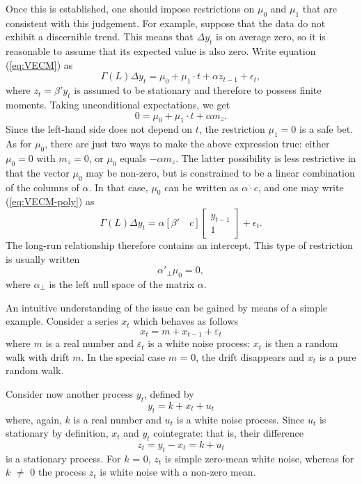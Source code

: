 Once this is established, one should impose restrictions on $\mu_0$
and $\mu_1$ that are consistent with this judgement. For example,
suppose that the data do not exhibit a discernible trend. This means
that $\Delta y_t$ is on average zero, so it is reasonable to assume
that its expected value is also zero. Write equation (\ref{eq:VECM})
as
\begin{equation}
  \label{eq:VECM-poly}
  \Gamma(L) \Delta y_t = \mu_0 + \mu_1 \cdot t + \alpha z_{t-1} +
  \epsilon_t ,
\end{equation}
where $z_{t} = \beta' y_{t}$ is assumed to be stationary and therefore
to possess finite moments. Taking unconditional expectations, we get
\[ 
  0 = \mu_0 + \mu_1 \cdot t + \alpha m_z .
\]
Since the left-hand side does not depend on $t$, the restriction
$\mu_1 = 0$ is a safe bet.  As for $\mu_0$, there are just two ways to
make the above expression true: either $\mu_0 = 0$ with $m_z = 0$, or
$\mu_0$ equals $-\alpha m_z$.  The latter possibility is less
restrictive in that the vector $\mu_0$ may be non-zero, but is
constrained to be a linear combination of the columns of $\alpha$.  In
that case, $\mu_0$ can be written as $\alpha \cdot c$, and one may
write (\ref{eq:VECM-poly}) as
\[
  \Gamma(L) \Delta y_t = \alpha \left[ \beta' \quad c \right] 
  \left[ \begin{array}{c} y_{t-1} \\ 1 \end{array} \right]  
  + \epsilon_t .
\]
The long-run relationship therefore contains an intercept. This type of
restriction is usually written
\[
  \alpha'_{\perp} \mu_0 = 0 ,
\]
where $\alpha_{\perp}$ is the left null space of the matrix $\alpha$.

An intuitive understanding of the issue can be gained by means of a
simple example. Consider a series $x_t$ which behaves as follows
%      
\[ x_t = m + x_{t-1} + \varepsilon_t \] 
%
where $m$ is a real number and $\varepsilon_t$ is a white noise
process: $x_t$ is then a random walk with drift $m$.  In the special
case $m$ = 0, the drift disappears and $x_t$ is a pure random walk.
    
Consider now another process $y_t$, defined by
%      
\[ y_t = k + x_t + u_t \] 
%
where, again, $k$ is a real number and $u_t$ is a white noise process.
Since $u_t$ is stationary by definition, $x_t$ and $y_t$ cointegrate:
that is, their difference
%      
\[ z_t = y_t - x_t = k + u_t \]
%	
is a stationary process. For $k$ = 0, $z_t$ is simple zero-mean white
noise, whereas for $k$ $\ne$ 0 the process $z_t$ is white noise with a
non-zero mean.
  
